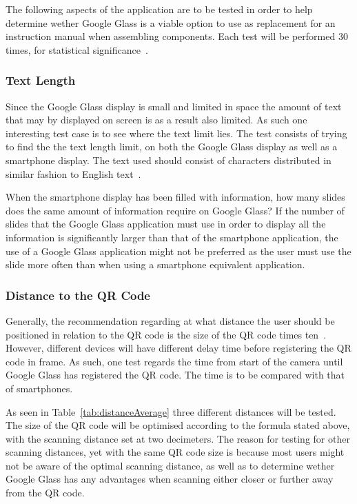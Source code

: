 The following aspects of the application are to be tested in order to help determine wether Google Glass is a viable option to use as replacement for an instruction manual when assembling components. Each test will be performed 30 times, for statistical significance~\cite{30sampleSize}.

\subsubsection{Text Length}
Since the Google Glass display is small and limited in space the amount of text that may by displayed on screen is as a result also limited. As such one interesting test case is to see where the text limit lies. The test consists of trying to find the the text length limit, on both the Google Glass display as well as a smartphone display. The text used should consist of characters distributed in similar fashion to English text~\cite{englishTextStat}.

When the smartphone display has been filled with information, how many slides does the same amount of information require on Google Glass? If the number of slides that the Google Glass application must use in order to display all the information is significantly larger than that of the smartphone application, the use of a Google Glass application might not be preferred as the user must use the slide more often than when using a smartphone equivalent application.



\subsubsection{Distance to the QR Code}
Generally, the recommendation regarding at what distance the user should be positioned in relation to the QR code is the size of the QR code times ten~\cite{qrCodeSizeComplexity}. However, different devices will have different delay time before registering the QR code in frame. As such, one test regards the time from start of the camera until Google Glass has registered the QR code. The time is to be compared with that of smartphones.

As seen in Table~\ref{tab:distanceAverage} three different distances will be tested. The size of the QR code will be optimised according to the formula stated above, with the scanning distance set at two decimeters. The reason for testing for other scanning distances, yet with the same QR code size is because most users might not be aware of the optimal scanning distance, as well as to determine wether Google Glass has any advantages when scanning either closer or further away from the QR code.

